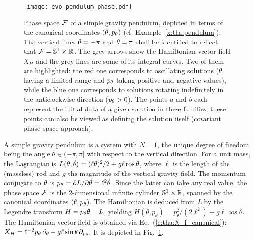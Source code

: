 \begin{figure}
\centerline{\texttt{[image: evo\_pendulum\_phase.pdf]}}
\caption[]{\label{f:tha:pendulum_phase} \footnotesize
Phase space $\mathcal{F}$ of a simple gravity pendulum, depicted in terms of the
canonical coordinates $(\theta,p_\theta)$ (cf. Example~\ref{x:tha:pendulum}).
The vertical lines $\theta=-\pi$ and $\theta=\pi$ shall be identified to reflect
that $\mathcal{F} = \mathbb{S}^1 \times \mathbb{R}$.
The grey arrows show the Hamiltonian vector field $X_H$ and the grey
lines are some of its integral curves. Two of them are highlighted: the red
one corresponds to oscillating solutions ($\theta$ having a limited range and $p_\theta$ taking positive and negative values), while the blue one corresponds to solutions
rotating indefinitely in the anticlockwise direction ($p_\theta>0$).
The points $a$ and $b$ each represent the initial data of a
given solution in these families; these points can also be viewed as defining
the solution itself (covariant phase space approach).}
\end{figure}

\begin{example}
\label{x:tha:pendulum}
A simple gravity pendulum is a system with $N=1$, the unique degree of
freedom being the angle $\theta\in(-\pi,\pi]$ with respect to the vertical direction.
For a unit mass, the Lagrangian is
$L(\theta,\dot{\theta}) = (\ell\dot{\theta})^2/2 + g \ell \cos\theta$,
where $\ell$ is the length of the (massless) rod and $g$
the magnitude of the vertical gravity field. The momentum conjugate to $\theta$
is $p_\theta = {\partial L}/{\partial \dot{\theta}} = \ell^2\dot{\theta}$. Since the latter can
take any real value, the phase space $\mathcal{F}$ is the 2-dimensional infinite cylinder
$\mathbb{S}^1 \times \mathbb{R}$,
spanned by the canonical coordinates $(\theta,p_\theta)$. The
Hamiltonian is deduced from $L$ by the Legendre transform $H = p_\theta \dot{\theta} - L$,
yielding
$H(\theta,p_\theta) = p_\theta^2 / (2\ell^2) - g\ell\cos\theta$.
The Hamiltonian vector field is obtained via Eq.~(\ref{e:tha:X_f_canonical}):
$X_H = \ell^{-2} p_\theta \, \partial_\theta - g \ell \sin\theta \, \partial_{p_\theta}$.
It is depicted in Fig.~\ref{f:tha:pendulum_phase}.
\end{example}


